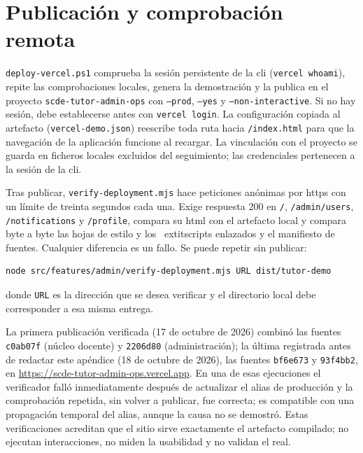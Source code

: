 \section*{Publicación y comprobación remota}
\texttt{deploy-vercel.ps1} comprueba la sesión persistente de la \acs{cli}
(\texttt{vercel whoami}), repite las comprobaciones locales, genera la
demostración y la publica en el proyecto \texttt{scde-tutor-admin-ops} con
\texttt{--prod}, \texttt{--yes} y \texttt{--non-interactive}. Si no hay sesión,
debe establecerse antes con \texttt{vercel login}. La configuración copiada al
artefacto (\texttt{vercel-demo.json}) reescribe toda ruta hacia
\texttt{/index.html} para que la navegación de la aplicación funcione al
recargar. La vinculación con el proyecto se guarda en ficheros locales
excluidos del seguimiento; las credenciales pertenecen a la sesión de la
\acs{cli}.

Tras publicar, \texttt{verify-deployment.mjs} hace peticiones anónimas por
\acs{https} con un límite de treinta segundos cada una. Exige respuesta 200 en
\texttt{/}, \texttt{/admin/users}, \texttt{/notifications} y \texttt{/profile},
compara su \acs{html} con el artefacto local y compara byte a byte las hojas de
estilo y los \	extit{scripts} enlazados y el manifiesto de fuentes. Cualquier
diferencia es un fallo. Se puede repetir sin publicar:
\begin{verbatim}
node src/features/admin/verify-deployment.mjs URL dist/tutor-demo
\end{verbatim}
donde \texttt{URL} es la dirección que se desea verificar y el directorio local
debe corresponder a esa misma entrega.

La primera publicación verificada (17 de octubre de 2026) combinó las fuentes
\texttt{c0ab07f} (núcleo docente) y \texttt{2206d80} (administración); la última
registrada antes de redactar este apéndice (18 de octubre de 2026), las fuentes
\texttt{bf6e673} y \texttt{93f4bb2}, en \url{https://scde-tutor-admin-ops.vercel.app}.
En una de esas ejecuciones el verificador falló inmediatamente después de
actualizar el alias de producción y la comprobación repetida, sin volver a
publicar, fue correcta; es compatible con una propagación temporal del alias,
aunque la causa no se demostró. Estas verificaciones acreditan que el sitio
sirve exactamente el artefacto compilado; no ejecutan interacciones, no miden
la usabilidad y no validan el  real.

